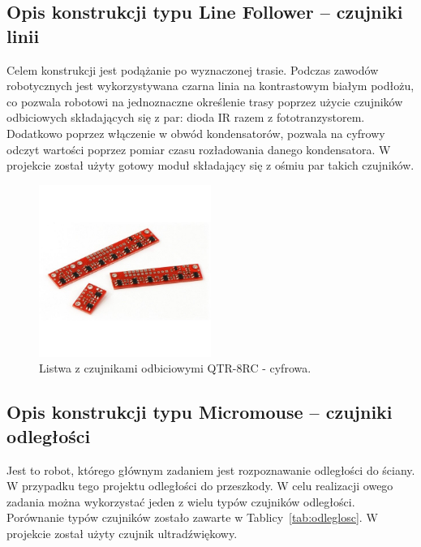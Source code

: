 \subsection{Opis konstrukcji typu Line Follower -- czujniki linii}
Celem konstrukcji jest podążanie po wyznaczonej trasie. Podczas zawodów robotycznych jest wykorzystywana czarna linia na kontrastowym białym podłożu, co pozwala robotowi na jednoznaczne określenie trasy poprzez użycie czujników odbiciowych składających się z par: dioda  IR razem z fototranzystorem. Dodatkowo poprzez włączenie w obwód kondensatorów, pozwala na cyfrowy odczyt wartości poprzez pomiar czasu rozładowania danego kondensatora. W projekcie został użyty gotowy moduł składający się z ośmiu par takich czujników.
\begin{figure}[H]
\centering
\includegraphics[width=0.5\textwidth]{inzynierku/img/listwa.jpg}
\caption{\label{fig:czujnik_odbiciowy}Listwa z czujnikami odbiciowymi QTR-8RC - cyfrowa.}
\end{figure}

\subsection{Opis konstrukcji typu Micromouse -- czujniki odległości}
Jest to robot, którego głównym zadaniem jest rozpoznawanie odległości do ściany. W przypadku tego projektu odległości do przeszkody. W celu realizacji owego zadania można wykorzystać jeden z wielu typów czujników odległości. Porównanie typów czujników zostało zawarte w Tablicy~\ref{tab:odleglosc}. W projekcie został użyty czujnik ultradźwiękowy.

